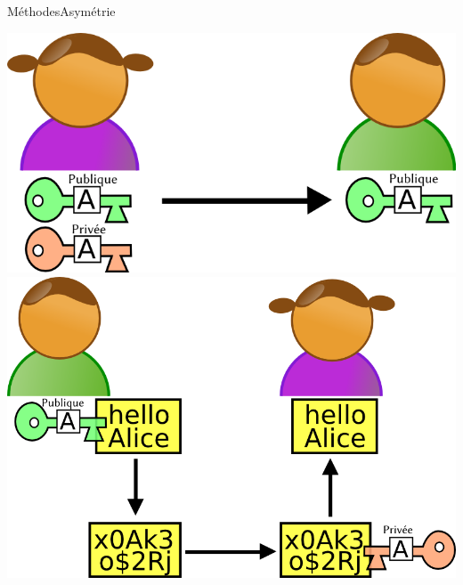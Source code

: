 \documentclass[12pt]{beamer}
\begin{document}
		\begin{frame}{Méthodes}{Asymétrie}
			\begin{center}
				 \includegraphics[scale=.28]{Asymetric_cryptography_-_step_1.png}\vspace{.1cm}\\
				\onslide<2> \hspace{.5cm}\includegraphics[scale=.26]{Asymetric_cryptography_-_step_2.png}
			\end{center}
		\end{frame}
		
\end{document}
